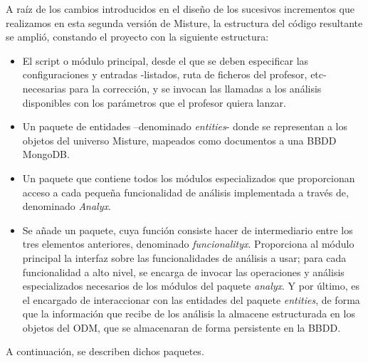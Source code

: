 A raíz de los cambios introducidos en el diseño de los sucesivos incrementos que realizamos en esta segunda versión de Misture, la estructura del código resultante se amplió, constando el proyecto con la siguiente estructura:\\

\begin{itemize}
\item El script o módulo principal, desde el que se deben especificar las configuraciones y entradas -listados, ruta de ficheros del profesor, etc- necesarias para la corrección, y se invocan las llamadas a los análisis disponibles con los parámetros que el profesor quiera lanzar.\\

\item Un paquete de entidades –denominado \textit{entities}- donde se representan a los objetos del universo Misture, mapeados como documentos a una BBDD MongoDB.\\

\item Un paquete que contiene todos los módulos especializados que proporcionan acceso a cada pequeña funcionalidad de análisis implementada a través de, denominado \textit{Analyx}.\\

\item Se añade un paquete, cuya función consiste hacer de intermediario entre los tres elementos anteriores, denominado \textit{funcionalityx}. Proporciona al módulo principal la interfaz sobre las funcionalidades de análisis a usar; para cada funcionalidad a alto nivel, se encarga de invocar las operaciones y análisis especializados necesarios de los módulos del paquete \textit{analyx}. Y por último, es el encargado de interaccionar con las entidades del paquete \textit{entities}, de forma que la información que recibe de los análisis la almacene estructurada en los objetos del ODM, que se almacenaran de forma persistente en la BBDD.
\end{itemize}

A continuación, se describen dichos paquetes.

